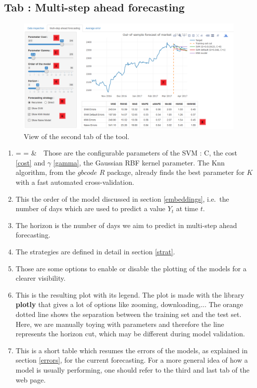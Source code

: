 \documentclass[11pt,a4paper,oneside]{book}
\makeatletter
\newcommand{\inlineitem}[1][]{%
\ifnum\enit@type=\tw@
    {\descriptionlabel{#1}}
  \hspace{\labelsep}
\else
  \ifnum\enit@type=\z@
       \refstepcounter{\@listctr}\fi
    \&\ \@itemlabel\ 
\fi}
\makeatother
\begin{document}
\subsection{Tab : Multi-step ahead forecasting}

\begin{figure}[!h]
  \centering
    \includegraphics[scale=0.44]{img/tab2.png}
  \caption{View of the second tab of the tool.}
  \label{fig:tool2}
\end{figure}

\begin{enumerate}
\item\inlineitem Those are the configurable parameters of the SVM : C, the cost \ref{cost} and $\gamma$ \ref{gamma}, the Gaussian RBF kernel parameter. The Knn algorithm, from the $gbcode$ $R$ package\cite{gbcode}, already finds the best parameter for $K$ with a fast automated cross-validation.
\item This the order of the model discussed in section \ref{embeddings}, i.e.\ the number of days which are used to predict a value $Y_t$ at time $t$.
\item The horizon is the number of days we aim to predict in multi-step ahead forecasting.
\item The strategies are defined in detail in section \ref{strat}.
\item Those are some options to enable or disable the plotting of the models for a clearer visibility.
\item This is the resulting plot with its legend. The plot is made with the library \textbf{plotly} \cite{plotly} that gives a lot of options like zooming, downloading,... The orange dotted line shows the separation between the training set and the test set. Here, we are manually toying with parameters and therefore the line represents the horizon cut, which may be different during model validation.
\item This is a short table which resumes the errors of the models, as explained in section \ref{errors}, for the current forecasting. For a more general idea of how a model is usually performing, one should refer to the third and last tab of the web page. 
\end{enumerate}
\end{document}

